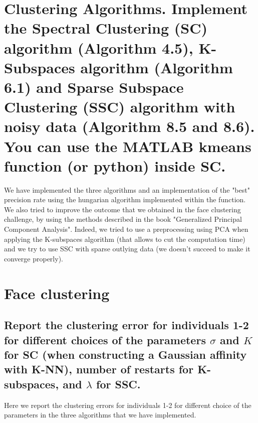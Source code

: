 \documentclass[12pt,a4paper,onecolumn]{article}
\begin{document}
\section{Clustering Algorithms. Implement the Spectral Clustering (SC) algorithm (Algorithm 4.5), K-Subspaces algorithm (Algorithm 6.1) and Sparse Subspace Clustering (SSC) algorithm with noisy data (Algorithm 8.5 and 8.6). You can use the MATLAB kmeans function (or python) inside SC.}
\label{section_algos}

We have implemented the three algorithms and an implementation of the "best" precision rate using the hungarian algorithm implemented within the function. \\
We also tried to improve the outcome that we obtained in the face clustering challenge, by using the methods described in the book "Generalized Principal Component Analysis". Indeed, we tried to use a preprocessing using PCA when applying the K-subspaces algorithm (that allows to cut the computation time) and we try to use SSC with sparse outlying data (we doesn't succeed to make it converge properly).

\section{Face clustering}

\subsection{Report the clustering error for individuals 1-2 for different choices of the parameters \(\sigma\) and \(K\) for SC (when constructing a Gaussian affinity with K-NN), number of restarts for K-subspaces, and \(\lambda\) for SSC.}

Here we report the clustering errors for individuals 1-2 for different choice of the parameters in the three algorithms that we have implemented.
\end{document}
